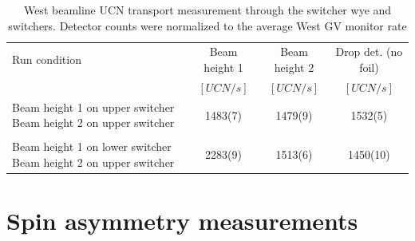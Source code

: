 
\begin{table}
    \centering
    \caption{West beamline UCN transport measurement through the switcher wye and switchers. Detector counts were normalized to the average West GV monitor rate}\label{tb:2021_transport}
    \begin{tabular}{
        p{2in} 
        c
        c
        c
    }
    \toprule
        {Run condition} & {Beam height 1} & {Beam height 2} &{Drop det. (no foil)} \\
        & {$[\unit{UCN\per s}]$} & {$[\unit{UCN\per s}]$} & {$[\unit{UCN\per s}]$}\\
    \midrule
        {\small Beam height 1 on upper switcher Beam height 2 on upper switcher} &  1483(7) & 1479(9) & 1532(5)\\
        \\
        {\small Beam height 1 on lower switcher Beam height 2 on upper switcher} &  2283(9) & 1513(6) & 1450(10)\\
    \bottomrule
    \end{tabular}
\end{table}


\section{Spin asymmetry measurements}\label{sec:asymmetry_west_2021}


